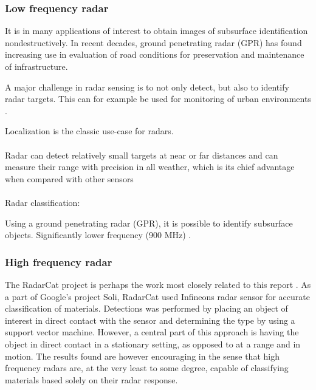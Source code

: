 \subsubsection{Low frequency radar}

It is in many applications of interest to obtain images of subsurface identification nondestructively. In recent decades, ground penetrating radar (GPR) has found increasing use in evaluation of road conditions \citep{solla_gonzález-jorge_varela_lorenzo_2013} for preservation and maintenance of infrastructure.


A major challenge in radar sensing is to not only detect, but also to identify radar targets. This can for example be used for monitoring of urban environments \citep{harter_kowalewski_sit_jalilvand_ziroff_zwick_2014}.


Localization is the classic use-case for radars. 
\\ \\
 Radar  can detect relatively small targets at near or far distances and can measure their range with  precision  in  all weather,  which is  its chief  advantage when compared with other  sensors \citep{skolnik_2009}
\\ \\
Radar classification: 


Using a ground penetrating radar (GPR), it is possible to identify subsurface objects. 
Significantly lower frequency (900 MHz)
\citep{lu_pu_liu_2014}.
\citep{daniels_2004}


\subsubsection{High frequency radar}
The RadarCat project is perhaps the work most closely related to this report \citep{yeo_2016}. As a part of Google's project Soli, RadarCat used Infineons radar sensor for accurate classification of materials. Detections was performed by placing an object of interest in direct contact with the sensor and determining the type by using a support vector machine. However, a central part of this approach is having the object in direct contact in a stationary setting, as opposed to at a range and in motion. The results found are however encouraging in the sense that high frequency radars are, at the very least to some degree, capable of classifying materials based solely on their radar response. 


